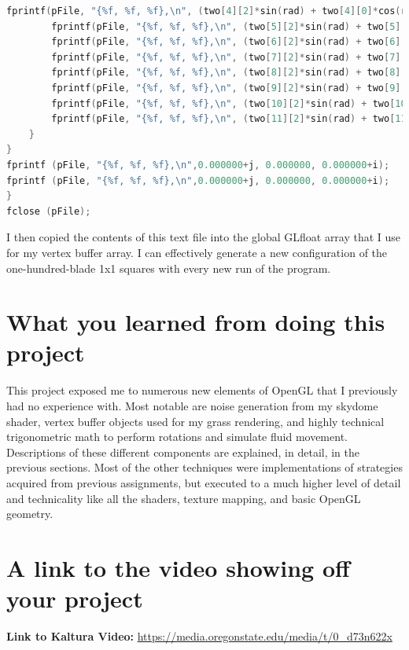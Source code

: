 \documentclass[journal,10pt,onecolumn,compsoc]{IEEEtran}
\begin{document}
\begin{lstlisting}[language=C++]
        fprintf(pFile, "{%f, %f, %f},\n", (two[4][2]*sin(rad) + two[4][0]*cos(rad)) + j, 0.000000, (two[4][2]*cos(rad) - two[4][0]*sin(rad)) + i);
        fprintf(pFile, "{%f, %f, %f},\n", (two[5][2]*sin(rad) + two[5][0]*cos(rad)) + j, 0.000000, (two[5][2]*cos(rad) - two[5][0]*sin(rad)) + i);
        fprintf(pFile, "{%f, %f, %f},\n", (two[6][2]*sin(rad) + two[6][0]*cos(rad)) + j, 0.055000, (two[6][2]*cos(rad) - two[6][0]*sin(rad)) + i);
        fprintf(pFile, "{%f, %f, %f},\n", (two[7][2]*sin(rad) + two[7][0]*cos(rad)) + j, 0.055000, (two[7][2]*cos(rad) - two[7][0]*sin(rad)) + i);
        fprintf(pFile, "{%f, %f, %f},\n", (two[8][2]*sin(rad) + two[8][0]*cos(rad)) + j, 0.100000, (two[8][2]*cos(rad) - two[8][0]*sin(rad)) + i);
        fprintf(pFile, "{%f, %f, %f},\n", (two[9][2]*sin(rad) + two[9][0]*cos(rad)) + j, 0.055000, (two[9][2]*cos(rad) - two[9][0]*sin(rad)) + i);
        fprintf(pFile, "{%f, %f, %f},\n", (two[10][2]*sin(rad) + two[10][0]*cos(rad)) + j, 0.000000, (two[10][2]*cos(rad) - two[10][0]*sin(rad)) + i);
        fprintf(pFile, "{%f, %f, %f},\n", (two[11][2]*sin(rad) + two[11][0]*cos(rad)) + j, 0.000000, (two[11][2]*cos(rad) - two[11][0]*sin(rad)) + i);
    }
}
fprintf (pFile, "{%f, %f, %f},\n",0.000000+j, 0.000000, 0.000000+i);
fprintf (pFile, "{%f, %f, %f},\n",0.000000+j, 0.000000, 0.000000+i);
}
fclose (pFile);
\end{lstlisting}
\normalsize
I then copied the contents of this text file into the global GLfloat array that I use for my vertex buffer array. I can effectively generate a new configuration of the one-hundred-blade 1x1 squares with every new run of the program.
\section{What you learned from doing this project}
\noindent This project exposed me to numerous new elements of OpenGL that I previously had no experience with. Most notable are noise generation from my skydome shader, vertex buffer objects used for my grass rendering, and highly technical trigonometric math to perform rotations and simulate fluid movement. Descriptions of these different components are explained, in detail, in the previous sections. Most of the other techniques were implementations of strategies acquired from previous assignments, but executed to a much higher level of detail and technicality like all the shaders, texture mapping, and basic OpenGL geometry.
\section{A link to the video showing off your project}
\begin{center}
\textbf{Link to Kaltura Video:} 
\url{https://media.oregonstate.edu/media/t/0_d73n622x}

\end{center}
\newpage
\end{document}
